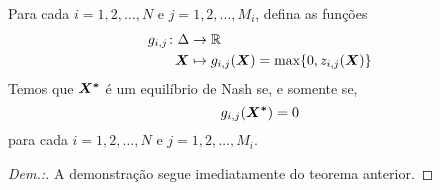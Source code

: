 \raggedbottom %

\begin{theorem}
    Para cada $i=1,2,\dots,N$ e $j=1,2,\dots,M_i$, defina as funções
    \begin{align*}
        \begin{split}
            g_{i,j} \colon \Delta &\to \mathbb{R}\\
            \boldsymbol{X} &\mapsto g_{i,j}(\boldsymbol{X})=\textup{max}\{0,z_{i,j}(\boldsymbol{X})\}
        \end{split}
    \end{align*}
    Temos que $\boldsymbol{X^*}$ é um equilíbrio de Nash se, e somente se,
    \begin{equation*}
        g_{i,j}(\boldsymbol{X^*})= 0
    \end{equation*}
    para cada $i=1,2,\dots,N$ e $j=1,2,\dots,M_i$.
\end{theorem}

\begin{proof}[Dem.:]
    A demonstração segue imediatamente do teorema anterior.
\end{proof}

